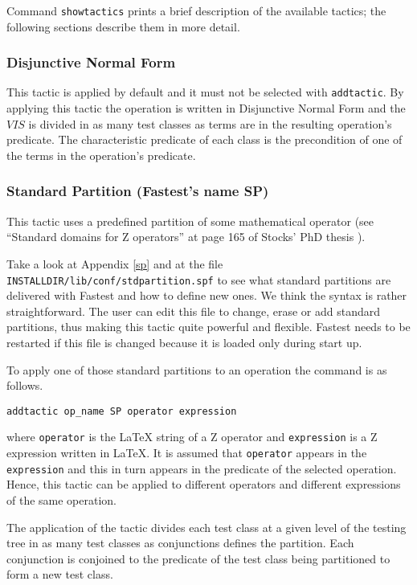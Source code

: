 Command \verb+showtactics+ prints a brief description of the available tactics; the following sections describe them in more detail.

\subsubsection{Disjunctive Normal Form}
This tactic is applied by default and it must not be selected with \verb+addtactic+. By applying this tactic the operation is written in Disjunctive Normal Form and the $VIS$ is divided in as many test classes as terms are in the resulting operation's predicate. The characteristic predicate of  each class is the precondition of one of the terms in the operation's predicate.

\subsubsection{Standard Partition (Fastest's name SP)}
This tactic uses a predefined partition of some mathematical operator (see ``Standard domains for Z operators'' at page 165 of Stocks' PhD thesis \cite{Stocks}). 

Take a look at Appendix \ref{sp} and at the file \verb+INSTALLDIR/lib/conf/stdpartition.spf+ to see what standard partitions are delivered with Fastest and how to define new ones. We think the syntax is rather straightforward. The user can edit this file to change, erase or add standard partitions, thus making this tactic quite powerful and flexible. Fastest needs to be restarted if this file is changed because it is loaded only during start up.

To apply one of those standard partitions to an operation the command is as follows.

\begin{verbatim}
addtactic op_name SP operator expression
\end{verbatim}

\noindent where \verb+operator+ is the \LaTeX{} string of a Z operator and \verb+expression+ is a Z expression written in \LaTeX. It is assumed that \verb+operator+ appears in the \verb+expression+ and this in turn appears in the predicate of the selected operation. Hence, this tactic can be applied to different operators and different expressions of the same operation.

The application of the tactic divides each test class at a given level of the testing tree in as many test classes as conjunctions defines the partition. Each conjunction is conjoined to the predicate of the test class being partitioned to form a new test class.

